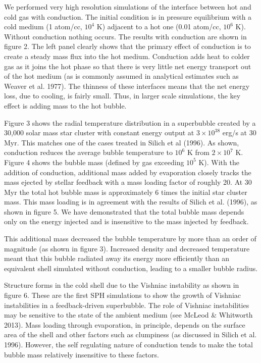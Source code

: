 \documentclass[12pt]{report}
\begin{document}

\huge
We performed very high resolution simulations of the interface between
hot and cold gas with conduction.  The initial condition is in
pressure equilibrium with a cold medium (1 atom/cc, $10^4$ K) adjacent
to a hot one (0.01 atom/cc, $10^6$ K).  Without conduction nothing
occurs.  The results with conduction are shown in figure 2.  The left
panel clearly shows that the primary effect of conduction is to create
a steady mass flux into the hot medium.  Conduction adds heat to colder
gas as it joins the hot phase so that there is very little net energy
transport out of the hot medium (as is commonly assumed in analytical estimates
such as Weaver et al. 1977).  The thinness of these interfaces means
that the net energy loss, due to cooling, is fairly small.  Thus, in
larger scale simulations, the key effect is adding mass to the hot
bubble.

Figure 3 shows the radial temperature distribution in a superbubble
created by a 30,000 solar mass star cluster with constant energy
output at $3 \times 10^{38}$ erg/s at 30 Myr.  This matches one of the
cases treated in Silich et al (1996).  As shown, conduction reduces
the average bubble temperature to $10^6$ K from $2\times 10^7$ K.
Figure 4 shows the bubble mass (defined by gas exceeding $10^5$ K).
With the addition of conduction, additional mass added by evaporation
closely tracks the mass ejected by stellar feedback with a mass
loading factor of roughly 20.  At 30 Myr the total hot bubble mass is
approximately 6 times the initial star cluster mass.  This mass
loading is in agreement with the results of Silich et
al. (1996), as shown in figure 5.  We have demonstrated that the total bubble mass 
depends only on the energy injected and is insensitive to the mass injected by feedback.

This additional mass decreased the bubble temperature by more than an order of
magnitude (as shown in figure 3).  Increased density and decreased temperature
meant that this bubble radiated away its energy more efficiently than an
equivalent shell simulated without conduction, leading to a smaller bubble radius.

Structure forms in the cold shell due to the Vishniac instability as
shown in figure 6.  These are the first SPH simulations to show the
growth of Vishniac instabilities in a feedback-driven superbubble.
The role of Vishniac instabilities may be sensitive to the state of
the ambient medium (see McLeod \& Whitworth 2013).  Mass loading
through evaporation, in principle, depends on the surface area of the
shell and other factors such as clumpiness (as discussed in Silich et
al. 1996).  However, the self regulating nature of conduction tends to
make the total bubble mass relatively insensitive to these factors.
\end{document}
